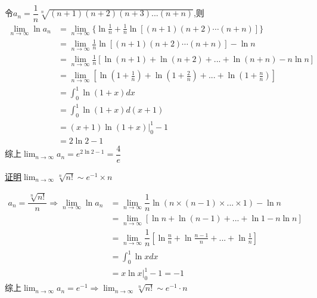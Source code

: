 \documentclass[8pt a4paper, oneside, UTF8]{ctexbook}
\begin{document}
\begin{sloppypar}
\begin{problem}
    \end{problem}
    \begin{solution}
        令$a_n=\dfrac{1}{n}\sqrt[n]{(n+1)(n+2)(n+3)...(n+n)}$,则
        \begin{align*}
            \lim_{n \to \infty}\ln a_n & = \lim_{n \to \infty} \{ \ln\frac{1}{n}+\frac{1}{n} \ln[(n+1)(n+2)\cdots(n+n)]\}\\
          & = \lim_{n\to \infty}\frac{1}{n} \ln[(n+1)(n+2)\cdots(n+n)]- \ln n\\
          & = \lim_{n \to \infty}\frac{1}{n}[\ln(n+1)+\ln(n+2)+...+\ln(n+n)-n\ln n]\\
          & = \lim_{n\to \infty}[\ln(1+\frac{1}{n})+\ln(1+\frac{2}{n})+...+\ln(1+\frac{n}{n})]\\
          & = \int_0^1 \ln(1+x)dx \\
          & = \int_0^1 \ln(1+x)d(x+1)\\
          & = (x+1)\ln(1+x)|_0^1 -1\\
          & = 2\ln2 -1
        \end{align*}
    综上$\lim_{n\to \infty}a_n=e^{2\ln2-1}=\dfrac{4}{e}$
    \end{solution}
    \begin{problem}
        \uline{证明$\lim_{n\to \infty}\sqrt[n]{n!}\sim e^{-1}\times n$}
    \end{problem}
    \begin{solution}
        \begin{align*}
            a_n=\dfrac{\sqrt[n]{n!}}{n} \Rightarrow \lim_{n\to \infty}\ln a_n & =\lim_{n\to \infty}\dfrac{1}{n}\ln(n\times (n-1)\times ...\times 1)-\ln n    \\
            & =  \lim_{n \to \infty}[\ln n+\ln(n-1)+...+\ln 1-n\ln n]\\
            & = \lim_{n\to \infty}\dfrac{1}{n}[\ln\frac{n}{n}+\ln\frac{n-1}{n}+...+\ln \frac{1}{n}]\\
            & =\int _0 ^1 \ln x dx\\
            & = x \ln x|_0^1-1 = -1
        \end{align*}
    综上$\lim_{n \to \infty}a_n=e^{-1} \Rightarrow \lim_{n\to \infty}\sqrt[n]{n!}\sim e^{-1}\cdot n$
    \end{solution}

\end{sloppypar}
\end{document}
